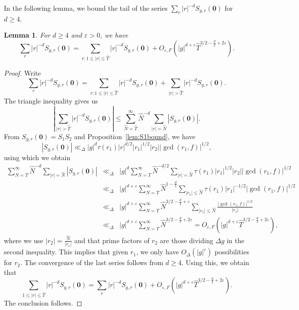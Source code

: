 \documentclass[10pt]{amsart}
\theoremstyle{plain}
\theoremstyle{plain}
\newtheorem{lemma}[theorem]{Lemma}
\renewcommand{\vec}[1]{\mathbf{#1}}
\theoremstyle{remark}
\theoremstyle{definition}
\renewcommand{\hat}{\widehat}
\begin{document}
In the following lemma, we bound the tail of the series  $\sum_r |r|^{-d}S_{g,r}(\vec{0})$ for $d\geq 4$. 
\begin{lemma}\label{lem:estimate}For $d\geq 4$ and  $\varepsilon>0$, we have
\[ \sum_{r}|r|^{-d}S_{g,r}(\vec{0}) = \sum_{r:1\leq |r|\leq \hat{T}}|r|^{-d}S_{g,r}(\vec{0})+O_{\varepsilon,F}(|g|^{d+\varepsilon}\hat{T}^{3/2-\frac{d}{2}+2\varepsilon}).\]
\end{lemma}
\begin{proof}
Write 
\[\sum_{r}|r|^{-d}S_{g,r}(\vec{0})=\sum_{r:1\leq |r|\leq \hat{T}}|r|^{-d}S_{g,r}(\vec{0})+\sum_{|r|>\hat{T}}|r|^{-d}S_{g,r}(\vec{0}).\]
The triangle inequality gives us
\[
\left|\sum_{|r|>\hat{T}}|r|^{-d}S_{g,r}(\vec{0})\right|\leq \sum_{\hat{N}=\hat{T}}^{\infty}\hat{N}^{-d}\sum_{|r|=\hat{N}}|S_{g,r}(\vec{0})|.
\]
From $S_{g,r}(\vec{0})=S_1S_2$ and Proposition~\ref{lem:S1bound}, we have
\[|S_{g,r}(\vec{0})|\ll_{\Delta} |g|^d\tau(r_1)|r|^{d/2}|r_1|^{1/2}|r_2||\gcd(r_1,f)|^{1/2},\]
using which we obtain
\begin{eqnarray*}\sum_{N=T}^{\infty}\hat{N}^{-d}\sum_{|r|=\hat{N}}|S_{g,r}(\vec{0})|&\ll_{\Delta}& |g|^d\sum_{N=T}^{\infty}\hat{N}^{-d/2}\sum_{|r|=\hat{N}} \tau(r_1)|r_1|^{1/2}|r_2||\gcd(r_1,f)|^{1/2}\\ &\ll_{\Delta} & |g|^{d+\varepsilon}\sum_{N=T}^{\infty}\hat{N}^{1-\frac{d}{2}}\sum_{|r_1|\leq\hat{N}} \tau(r_1)|r_1|^{-1/2}|\gcd(r_1,f)|^{1/2}\\ &\ll_{\Delta} & |g|^{d+\varepsilon}\sum_{N=T}^{\infty}\hat{N}^{3/2-\frac{d}{2}+\varepsilon}\sum_{|r_1|\leq\hat{N}}\frac{|\gcd(r_1,f)|^{1/2}}{|r_1|}\\ &\ll_{\Delta}& |g|^{d+\varepsilon}\sum_{N=T}^{\infty}\hat{N}^{3/2-\frac{d}{2}+2\varepsilon}=O_{\varepsilon,F}(|g|^{d+\varepsilon}\hat{T}^{3/2-\frac{d}{2}+2\varepsilon}),
\end{eqnarray*}
where we use $|r_2|=\frac{\hat{N}}{|r_1|}$ and that prime factors of $r_2$ are those dividing $\Delta g$ in the second inequality.  This implies that given $r_1$, we only have  $O_{\Delta}(|g|^{\varepsilon})$ possibilities for $r_2.$
The convergence of the last series follows  from $d\geq 4$.
 Using this, we obtain that
\[\sum_{1\leq |r|\leq \hat{T}}|r|^{-d}S_{g,r}(\vec{0})=\sum_{r}|r|^{-d}S_{g,r}(\vec{0})+O_{\varepsilon,F}(|g|^{d+\varepsilon}\hat{T}^{3/2-\frac{d}{2}+2\varepsilon}).\]
The conclusion follows.
\end{proof}
\end{document}
